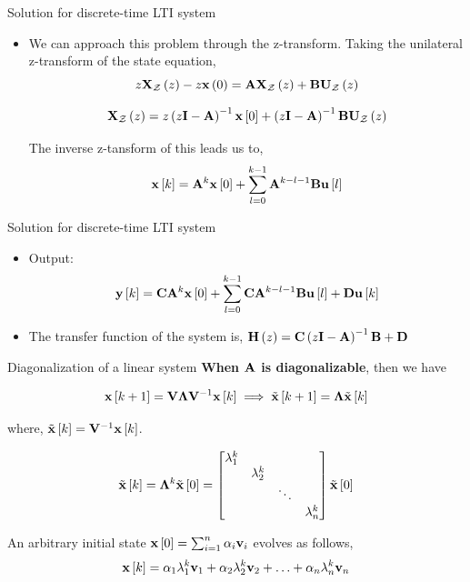 \documentclass[aspectratio=169]{beamer}
\def\mf{\ensuremath\mathbf}
\def\lp{\ensuremath\left(}
\def\rp{\ensuremath\right)}
\def\ls{\ensuremath\left[}
\def\rs{\ensuremath\right]}
\def\bmx{\ensuremath\begin{bmatrix*}[r]}
\def\emx{\ensuremath\end{bmatrix*}}
\newcommand{\ct}[1]{\lp #1\rp}
\newcommand{\dt}[1]{\ls #1\rs}
\begin{document}
\begin{frame}[t]{Solution for discrete-time LTI system}
\begin{itemize}
    \item We can approach this problem through the z-transform. Taking the unilateral z-transform of the state equation, 
    \[ z\mf{X}_{\mathcal{Z}}\ct{z} - z\mf{x}\ct{0} = \mf{A}\mf{X}_{\mathcal{Z}}\ct{z} + \mf{B}\mf{U}_{\mathcal{Z}}\ct{z} \]

    \[ \mf{X}_{\mathcal{Z}}\ct{z} = z\lp z\mf{I} - \mf{A}\rp^{-1}\mf{x}\dt{0} +  \lp z\mf{I} - \mf{A}\rp^{-1}\mf{B}\mf{U}_{\mathcal{Z}}\ct{z} \]
    
    The inverse z-tansform of this leads us to,
    $$\mf{x}\dt{k} = \mf{A}^k\mf{x}\dt{0} + \sum_{l=0}^{k-1}\mf{A}^{k-l-1}\mf{B}\mf{u}\dt{l}$$
\end{itemize}
\end{frame}


\begin{frame}[t]{Solution for discrete-time LTI system}
\begin{itemize}
    \item Output:
    $$ \mf{y}\dt{k} = \mf{C}\mf{A}^k\mf{x}\dt{0} + \sum_{l=0}^{k-1}\mf{C}\mf{A}^{k-l-1}\mf{B}\mf{u}\dt{l} + \mf{D}\mf{u}\dt{k} $$

    \item The transfer function of the system is, $\mf{H}\ct{z} = \mf{C}\lp z\mf{I} - \mf{A}\rp^{-1}\mf{B} + \mf{D}$
\end{itemize}
\end{frame}


\begin{frame}[t]{Diagonalization of a linear system}
\textbf{When $\mf{A}$ is diagonalizable}, then we have

\[ \mf{x}\dt{k + 1} = \mf{V}\mf{\Lambda}\mf{V}^{-1}\mf{x}\dt{k} \implies \tilde{\mf{x}}\dt{k + 1} = \mf{\Lambda}\tilde{\mf{x}}\dt{k} \]\vspace{-0.5cm}

where, $\tilde{\mf{x}}\dt{k} = \mf{V}^{-1}\mf{x}\dt{k}$.

\[ \tilde{\mf{x}}\dt{k} = \mf{\Lambda}^k\tilde{\mf{x}}\dt{0} = \bmx 
 \lambda_1^k & & & \\
 &  \lambda_2^k & & \\
 & & \ddots & \\
 & & &  \lambda_n^k
\emx \tilde{\mf{x}}\dt{0} \]

An arbitrary initial state $\mf{x}\dt{0} = \sum_{i=1}^{n}\alpha_i\mf{v}_i$ evolves as follows,
\[ \mf{x}\dt{k} = \alpha_1 \lambda_1^k\mf{v}_1 + \alpha_2 \lambda_2^k\mf{v}_2 + \ldots + \alpha_n \lambda_n^k\mf{v}_n\]
\end{frame}
\end{document}
